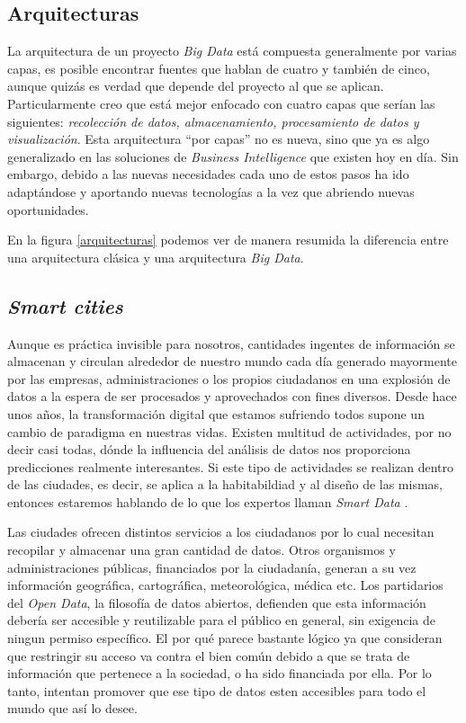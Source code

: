 \subsection{Arquitecturas}

La arquitectura de un proyecto \emph{Big Data} está compuesta generalmente por varias capas, es posible encontrar fuentes que hablan de cuatro y también de cinco, aunque quizás es verdad que depende del proyecto al que se aplican. Particularmente creo que está mejor enfocado con cuatro capas que serían las siguientes: \emph{recolección de datos, almacenamiento, procesamiento de datos y visualización}. Esta arquitectura “por capas” no es nueva, sino que ya es algo generalizado en las soluciones de \textit{Business Intelligence} que existen hoy en día. Sin embargo, debido a las nuevas necesidades cada uno de estos pasos ha ido adaptándose y aportando nuevas tecnologías a la vez que abriendo nuevas oportunidades. 

En la figura \ref{arquitecturas} podemos ver de manera resumida la diferencia entre una arquitectura clásica y una arquitectura\textit{ Big Data}.


\subsection{\emph{Smart cities}}

Aunque es práctica invisible para nosotros, cantidades ingentes de información se almacenan y circulan alrededor de nuestro mundo cada día generado mayormente por las empresas, administraciones o los propios ciudadanos en una explosión de datos a la espera de ser procesados y aprovechados con fines diversos. Desde hace unos años, la transformación digital que estamos sufriendo todos supone un cambio de paradigma en nuestras vidas. Existen multitud de actividades, por no decir casi todas, dónde la influencia del análisis de datos nos proporciona predicciones realmente interesantes. Si este tipo de actividades se realizan dentro de las ciudades, es decir, se aplica a la habitabildiad y al diseño de las mismas, entonces estaremos hablando de lo que los expertos llaman \emph{Smart Data} \cite{foote_big_2018}.

Las ciudades ofrecen distintos servicios a los ciudadanos por lo cual necesitan recopilar y almacenar una gran cantidad de datos. Otros organismos y administraciones públicas, financiados por la ciudadanía, generan a su vez información geográfica, cartográfica, meteorológica, médica etc. Los partidarios del \emph{Open Data}, la filosofía de datos abiertos, defienden que esta información debería ser accesible y reutilizable para el público en general, sin exigencia de ningun permiso específico. El por qué parece bastante lógico ya que consideran que restringir su acceso va contra el bien común debido a que se trata de información que pertenece a la sociedad, o ha sido financiada por ella. Por lo tanto, intentan promover que ese tipo de datos esten accesibles para todo el mundo que así lo desee. 

